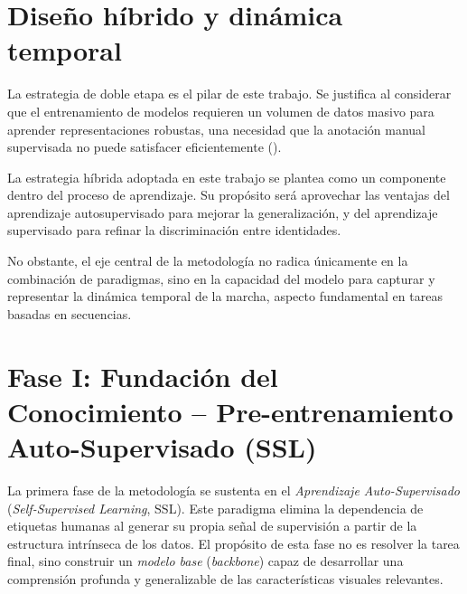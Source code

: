 \section{Diseño híbrido y dinámica temporal}

La estrategia de doble etapa es el pilar de este trabajo. Se justifica al considerar que el entrenamiento de modelos requieren un volumen de datos masivo para aprender representaciones robustas, una necesidad que la anotación manual supervisada no puede satisfacer eficientemente (\cite{Huang2025PersonViT, Lee2023GaitParse}).

La estrategia híbrida adoptada en este trabajo se plantea como un componente dentro del proceso de aprendizaje. Su propósito será aprovechar las ventajas del aprendizaje autosupervisado para mejorar la generalización, y del aprendizaje supervisado para refinar la discriminación entre identidades.

No obstante, el eje central de la metodología no radica únicamente en la combinación de paradigmas, sino en la capacidad del modelo para capturar y representar la dinámica temporal de la marcha, aspecto fundamental en tareas basadas en secuencias.

\section{Fase I: Fundación del Conocimiento – Pre-entrenamiento Auto-Supervisado (SSL)}

La primera fase de la metodología se sustenta en el \textit{Aprendizaje Auto-Supervisado} (\textit{Self-Supervised Learning}, SSL). Este paradigma elimina la dependencia de etiquetas humanas al generar su propia señal de supervisión a partir de la estructura intrínseca de los datos. El propósito de esta fase no es resolver la tarea final, sino construir un \textit{modelo base} (\textit{backbone}) capaz de desarrollar una comprensión profunda y generalizable de las características visuales relevantes.

